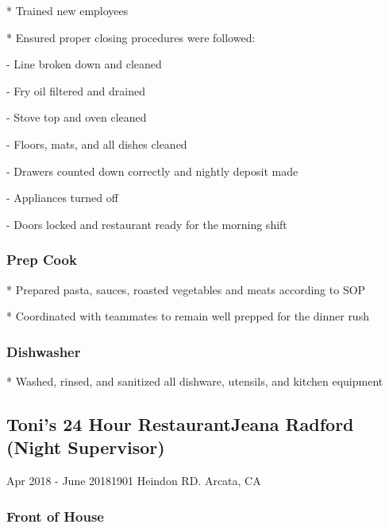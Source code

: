 \documentclass{article}
\begin{document}
* Trained new employees  

* Ensured proper closing procedures were followed:

\hspace{.25in}	- Line broken down and cleaned

	\hspace{.25in}	- Fry oil filtered and drained

	\hspace{.25in}	- Stove top and oven cleaned

	\hspace{.25in}	- Floors, mats, and all dishes cleaned

	\hspace{.25in}	- Drawers counted down correctly and nightly deposit made

	\hspace{.25in}	- Appliances turned off

	\hspace{.25in}	- Doors locked and restaurant ready for the morning shift



\subsubsection{Prep Cook}

* Prepared pasta, sauces, roasted vegetables and meats according to SOP

* Coordinated with teammates to remain well prepped for the dinner rush


\subsubsection{Dishwasher}

* Washed, rinsed, and sanitized all dishware, utensils, and kitchen equipment


\subsection{Toni's 24 Hour Restaurant\hfill Jeana Radford (Night Supervisor)}

\hspace{-.3in}Apr 2018 - June 2018\hfill 1901 Heindon RD. Arcata, CA

\subsubsection{Front of House}
\end{document}
